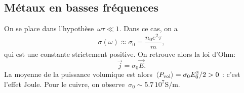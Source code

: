 \subsection{Métaux en basses fréquences}
On se place dans l'hypothèse~$\omega\tau\ll1$. Dans ce cas, on a
\begin{equation*}
    \boxed{
        \sigma(\omega)\approx\sigma_0=\frac{n_0 e^{2}\tau}{m},
    }
\end{equation*}
qui est une constante strictement positive. On retrouve alors la loi d'Ohm:
\begin{equation*}
    \boxed{
        \vec{j}=\sigma_0\vec{E}.
    }
\end{equation*}
La moyenne de la puissance volumique est alors~$\left\langle P_{\rm vol}\right\rangle=\sigma_0 E_0^{2}/2>0$ : c'est l'effet Joule. Pour le cuivre, on observe~$\sigma_{0}\sim 5.7\,10^{7}\si{\siemens\per\metre}$.